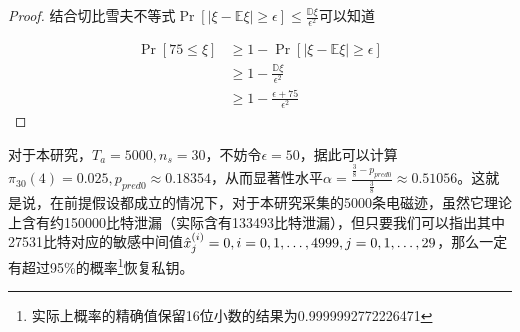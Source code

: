 {\begin{proof}
	结合切比雪夫不等式$\Pr\left[\vert \xi-\mathbb E\xi\vert\ge\epsilon\right]\le \frac{\mathbb D\xi}{\epsilon^2}$可以知道
	
	\begin{align*}
		\Pr\left[75\le\xi\right]&\ge1-\Pr\left[\vert \xi-\mathbb E\xi\vert\ge\epsilon\right]\\
		&\ge 1-\frac{\mathbb D\xi}{\epsilon^2}\\
		&\ge1-\frac{\epsilon+75}{\epsilon^2}
	\end{align*}

	\end{proof}
	对于本研究，$T_a=5000,n_s=30$，不妨令$\epsilon=50$，据此可以计算$\pi_{30}(4)=0.025,p_{pred0}\approx0.18354$，从而显著性水平$\alpha=\frac{\frac38-p_{pred0}}{\frac38}\approx0.51056$。这就是说，在前提假设都成立的情况下，对于本研究采集的5000条电磁迹，虽然它理论上含有约150000比特泄漏（实际含有133493比特泄漏），但只要我们可以指出其中27531比特对应的敏感中间值$\hat{x}^{(i)}_j=0,i=0,1,\dots,4999,j=0,1,\dots,29$，那么一定有超过95\%的概率\footnote{实际上概率的精确值保留16位小数的结果为0.9999992772226471}恢复私钥。
		

%


}
